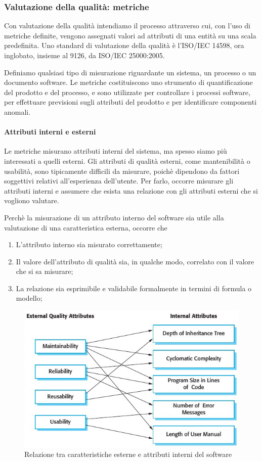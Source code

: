 \subsubsection{Valutazione della qualità: metriche}
Con valutazione della qualità intendiamo il processo attraverso cui, con l'uso di metriche definite, vengono assegnati valori ad attributi di una entità su una scala predefinita. Uno standard di valutazione della qualità è l'ISO/IEC 14598, ora inglobato, insieme al 9126, da ISO/IEC 25000:2005.

Definiamo  qualsiasi tipo di misurazione riguardante un sistema, un processo o un documento software. Le metriche costituiscono uno strumento di quantificazione del prodotto e del processo, e sono utilizzate per controllare i processi software, per effettuare previsioni sugli attributi del prodotto e per identificare componenti anomali.

\paragraph{Attributi interni e esterni}
Le metriche misurano attributi interni del sistema, ma spesso siamo più interessati a quelli esterni. Gli attributi di qualità esterni, come mantenibilità o usabilità, sono tipicamente difficili da misurare, poichè dipendono da fattori soggettivi relativi all'esperienza dell'utente. Per farlo, occorre misurare gli attributi interni e assumere che esista una relazione con gli attributi esterni che si vogliono valutare.

Perchè la misurazione di un attributo interno del software sia utile alla valutazione di una caratteristica esterna, occorre che
\begin{enumerate}
	\item L'attributo interno sia misurato correttamente;
	\item Il valore dell'attributo di qualità sia, in qualche modo, correlato con il valore che si sa misurare;
	\item La relazione sia esprimibile e validabile formalmente in termini di formula o modello;
\end{enumerate}

\begin{figure}[h]
	\centering
	\includegraphics[scale=0.6]{imgs/int_ext_attrib.jpg}
	\caption{Relazione tra caratteristiche esterne e attributi interni del software}
\end{figure}

